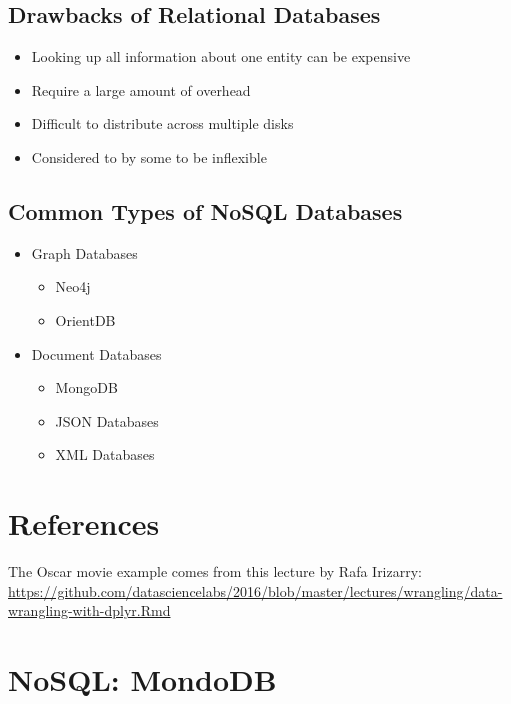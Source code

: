 \documentclass[]{book}
\providecommand{\tightlist}{%
  \setlength{\itemsep}{0pt}\setlength{\parskip}{0pt}}
\theoremstyle{definition}
\theoremstyle{definition}
\theoremstyle{definition}
\theoremstyle{remark}
\begin{document}
\subsection{Drawbacks of Relational
Databases}\label{drawbacks-of-relational-databases}

\begin{itemize}
\tightlist
\item
  Looking up all information about one entity can be expensive
\item
  Require a large amount of overhead
\item
  Difficult to distribute across multiple disks
\item
  Considered to by some to be inflexible
\end{itemize}

\subsection{Common Types of NoSQL
Databases}\label{common-types-of-nosql-databases}

\begin{itemize}
\tightlist
\item
  Graph Databases

  \begin{itemize}
  \tightlist
  \item
    Neo4j
  \item
    OrientDB
  \end{itemize}
\item
  Document Databases

  \begin{itemize}
  \tightlist
  \item
    MongoDB
  \item
    JSON Databases
  \item
    XML Databases
  \end{itemize}
\end{itemize}

\section{References}\label{references}

The Oscar movie example comes from this lecture by Rafa Irizarry:
\url{https://github.com/datasciencelabs/2016/blob/master/lectures/wrangling/data-wrangling-with-dplyr.Rmd}

\section{NoSQL: MondoDB}\label{nosql-mondodb}
\end{document}
